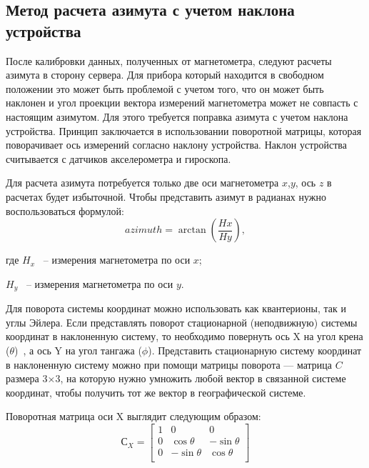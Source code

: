 \subsection{Метод расчета азимута с учетом наклона устройства}

После калибровки данных, полученных от магнетометра, следуют расчеты азимута в сторону сервера.
Для прибора который находится в свободном положении это может быть проблемой с учетом того, что
он может быть наклонен и угол проекции вектора измерений магнетометра может не совпасть с настоящим азимутом.
Для этого требуется поправка азимута с учетом наклона устройства. Принцип заключается в использовании 
поворотной матрицы, которая поворачивает ось измерений согласно наклону устройства. Наклон устройства 
считывается с датчиков акселерометра и гироскопа.

Для расчета азимута потребуется только две оси магнетометра $x$,$y$, ось $z$ в расчетах будет избыточной.
Чтобы представить азимут в радианах нужно воспользоваться формулой:
\begin{equation}
    \label{eq:domain:rawAzimuth}
    azimuth = \arctan\left(\frac{Hx}{Hy}\right),
  \end{equation}
  \begin{explanationx}
    \item[где] $H_x$ ~-- измерения магнетометра по оси $x$;
    \item $H_y$ ~-- измерения магнетометра по оси $y$.
  \end{explanationx}

Для поворота системы координат можно использовать как квантерионы, так и углы Эйлера.
Если представлять поворот стационарной (неподвижную) системы координат в наклоненную систему, то
необходимо повернуть ось X на угол крена ($\theta$)~, а ось Y на угол тангажа ($\phi$).
Представить стационарную систему координат в наклоненную систему можно при помощи матрицы поворота ---
матрица $C$ размера 3×3, на которую нужно умножить любой вектор в связанной системе координат, 
чтобы получить тот же вектор в географической системе.

Поворотная матрица оси X выглядит следующим образом:
\begin{equation}
    \label{eq:domain:rotateXmat}
    С_{X} = \begin{bmatrix} 1 & 0 & 0 \\ 
        0 & \cos{\theta} & -\sin{\theta} \\ 
        0 & -\sin{\theta} & \cos{\theta} \\ 
        \end{bmatrix}
    \end{equation}

